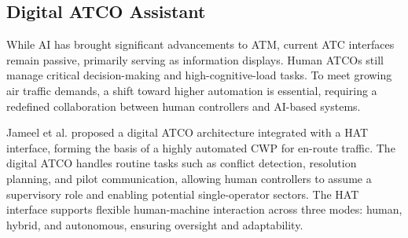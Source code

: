 \subsection{Digital ATCO Assistant}


While \gls{AI} has brought significant advancements to \gls{ATM}, current \gls{ATC} interfaces remain passive, primarily serving as information displays. 
Human \glspl{ATCO} still manage critical decision-making and high-cognitive-load tasks. 
To meet growing air traffic demands, a shift toward higher automation is essential, requiring a redefined collaboration between human controllers and \gls{AI}-based systems.


Jameel et al. \cite{Jameel_2023} proposed a digital \gls{ATCO} architecture integrated with a \gls{HAT} interface, forming the basis of a highly automated \gls{CWP} for en-route traffic. 
The digital \gls{ATCO} handles routine tasks such as conflict detection, resolution planning, and pilot communication, allowing human controllers to assume a supervisory role and enabling potential single-operator sectors.
The \gls{HAT} interface supports flexible human-machine interaction across three modes: human, hybrid, and autonomous, ensuring oversight and adaptability.


